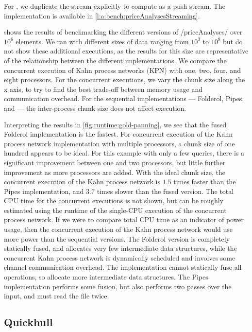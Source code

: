 For \Streaming, we duplicate the stream explicitly to compute \Hs@priceOverTime@ as a push stream.
The implementation is available in \cref{l:a:bench:priceAnalysesStreaming}.



 shows the results of benchmarking the different versions of \Hs/priceAnalyses/ over $10^6$ elements.
We ran with different sizes of data ranging from $10^3$ to $10^8$ but do not show these additional executions, as the results for this size are representative of the relationship between the different implementations.
We compare the concurrent execution of Kahn process networks (KPN) with one, two, four, and eight processors.
For the concurrent executions, we vary the chunk size along the x axis, to try to find the best trade-off between memory usage and communication overhead.
For the sequential implementations --- Folderol, Pipes, and \Streaming --- the inter-process chunk size does not affect execution.

Interpreting the results in \cref{fig:runtime:gold-panning}, we see that the fused Folderol implementation is the fastest.
For concurrent execution of the Kahn process network implementation with multiple processors, a chunk size of one hundred appears to be ideal.
For this example with only a few queries, there is a significant improvement between one and two processors, but little further improvement as more processors are added.
With the ideal chunk size, the concurrent execution of the Kahn process network is $1.5$ times faster than the Pipes implementation, and $3.7$ times slower than the fused version.
The total CPU time for the concurrent executions is not shown, but can be roughly estimated using the runtime of the single-CPU execution of the concurrent process network.
If we were to compare total CPU time as an indicator of power usage, then the concurrent execution of the Kahn process network would use more power than the sequential versions.
The Folderol version is completely statically fused, and allocates very few intermediate data structures, while the concurrent Kahn process network is dynamically scheduled and involves some channel communication overhead.
The \Streaming implementation cannot statically fuse all operations, so allocate more intermediate data structures.
The Pipes implementation performs some fusion, but also performs two passes over the input, and must read the file twice.

\subsection{Quickhull}

